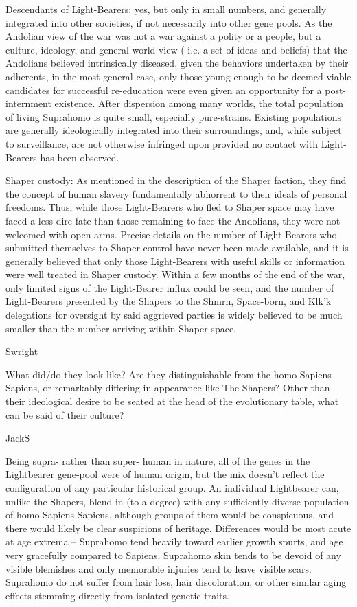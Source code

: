 Descendants of Light-Bearers: yes, but only in small numbers, and
generally integrated into other societies, if not necessarily into
other gene pools. As the Andolian view of the war was not a war
against a polity or a people, but a culture, ideology, and general
world view ( i.e. a set of ideas and beliefs) that the Andolians
believed intrinsically diseased, given the behaviors undertaken by
their adherents, in the most general case, only those young enough to
be deemed viable candidates for successful re-education were even
given an opportunity for a post-internment existence. After dispersion
among many worlds, the total population of living Suprahomo is quite
small, especially pure-strains. Existing populations are generally
ideologically integrated into their surroundings, and, while subject
to surveillance, are not otherwise infringed upon provided no contact
with Light-Bearers has been observed.

Shaper custody: As mentioned in the description of the Shaper faction,
they find the concept of human slavery fundamentally abhorrent to
their ideals of personal freedoms. Thus, while those Light-Bearers who
fled to Shaper space may have faced a less dire fate than those
remaining to face the Andolians, they were not welcomed with open
arms. Precise details on the number of Light-Bearers who submitted
themselves to Shaper control have never been made available, and it is
generally believed that only those Light-Bearers with useful skills or
information were well treated in Shaper custody. Within a few months
of the end of the war, only limited signs of the Light-Bearer influx
could be seen, and the number of Light-Bearers presented by the
Shapers to the Shmrn, Space-born, and Klk'k delegations for oversight
by said aggrieved parties is widely believed to be much smaller than
the number arriving within Shaper space.

Swright
	
What did/do they look like?  Are they distinguishable from the homo
Sapiens Sapiens, or remarkably differing in appearance like The
Shapers?  Other than their ideological desire to be seated at the head
of the evolutionary table, what can be said of their culture?

JackS

Being supra- rather than super- human in nature, all of the genes in
the Lightbearer gene-pool were of human origin, but the mix doesn't
reflect the configuration of any particular historical group. An
individual Lightbearer can, unlike the Shapers, blend in (to a degree)
with any sufficiently diverse population of homo Sapiens Sapiens,
although groups of them would be conspicuous, and there would likely
be clear suspicions of heritage. Differences would be most acute at
age extrema -- Suprahomo tend heavily toward earlier growth spurts,
and age very gracefully compared to Sapiens. Suprahomo skin tends to
be devoid of any visible blemishes and only memorable injuries tend to
leave visible scars. Suprahomo do not suffer from hair loss, hair
discoloration, or other similar aging effects stemming directly from
isolated genetic traits.


